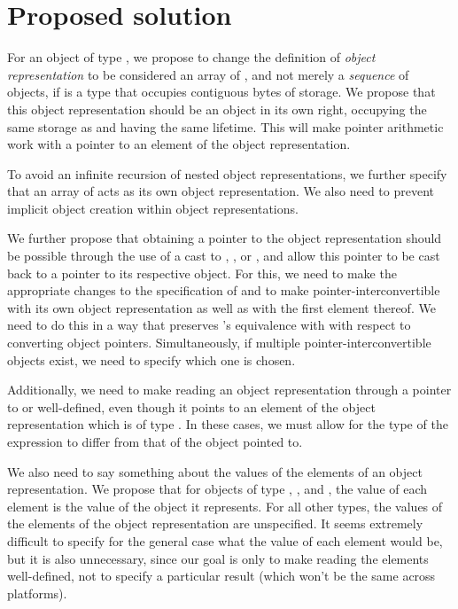 \section{Proposed solution}
\label{sec:design}

For an object  of type , we propose to change the definition of \emph{object representation} to be considered an array of , and not merely a \emph{sequence} of  objects, if  is a type that occupies contiguous bytes of storage. We propose that this object representation should be an object in its own right, occupying the same storage as  and having the same lifetime. This will make pointer arithmetic work with a pointer to an element of the object representation.

To avoid an infinite recursion of nested object representations, we further specify that an array of  acts as its own object representation. We also need to prevent implicit object creation \cite{P0593R6} within object representations.

We further propose that obtaining a pointer to the object representation should be possible through the use of a cast to , , or , and allow this pointer to be cast back to a pointer to its respective object. For this, we need to make the appropriate changes to the specification of  and to make  pointer-interconvertible with its own object representation as well as with the first element thereof. We need to do this in a way that preserves 's equivalence with  with respect to converting object pointers. Simultaneously, if multiple pointer-interconvertible objects exist, we need to specify which one  is chosen.

Additionally, we need to make reading an object representation through a pointer to  or  well-defined, even though it points to an element of the object representation which is of type . In these cases, we must allow for the type of the expression to differ from that of the object pointed to.

We also need to say something about the values of the elements of an object representation. We propose that for objects of type , , and , the value of each  element is the value of the object it represents. For all other types, the values of the elements of the object representation are unspecified. It seems extremely difficult to specify for the general case what the value of each element would be, but it is also unnecessary, since our goal is only to make reading the elements well-defined, not to specify a particular result (which won't be the same across platforms).

